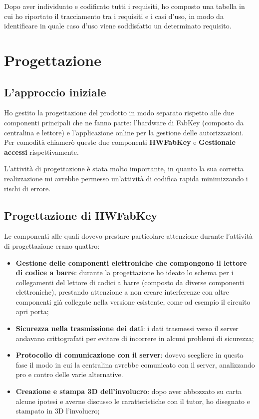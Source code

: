 Dopo aver individuato e codificato tutti i requisiti, ho composto una tabella in cui ho riportato il tracciamento tra i requisiti e i casi d'uso, in modo da identificare in quale caso d'uso viene soddisfatto un determinato requisito.

\section{Progettazione}
\subsection{L'approccio iniziale}
Ho gestito la progettazione del prodotto in modo separato rispetto alle due componenti principali che ne fanno parte: l'hardware di FabKey (composto da centralina e lettore) e l'applicazione online per la gestione delle autorizzazioni. Per comodità chiamerò queste due componenti \textbf{HWFabKey} e \textbf{Gestionale accessi} rispettivamente.

\medskip

L'attività di progettazione è stata molto importante, in quanto la sua corretta realizzazione mi avrebbe permesso un'attività di codifica rapida minimizzando i rischi di errore.

\bigskip

\subsection{Progettazione di HWFabKey}

Le componenti alle quali dovevo prestare particolare attenzione durante l'attività di progettazione erano quattro:
\begin{itemize}
\item \textbf{Gestione delle componenti elettroniche che compongono il lettore di codice a barre}: durante la progettazione ho ideato lo schema per i collegamenti del lettore di codici a barre (composto da diverse componenti elettroniche), prestando attenzione a non creare interferenze con altre componenti già collegate nella versione esistente, come ad esempio il circuito apri porta;
\item \textbf{Sicurezza nella trasmissione dei dati}: i dati trasmessi verso il server andavano crittografati per evitare di incorrere in alcuni problemi di sicurezza;
\item \textbf{Protocollo di comunicazione con il server}: dovevo scegliere in questa fase il modo in cui la centralina avrebbe comunicato con il server, analizzando pro e contro delle varie alternative.
\item \textbf{Creazione e stampa 3D dell'involucro}: dopo aver abbozzato su carta alcune ipotesi e averne discusso le caratteristiche con il tutor, ho disegnato e stampato in 3D l'involucro;
\end{itemize}

